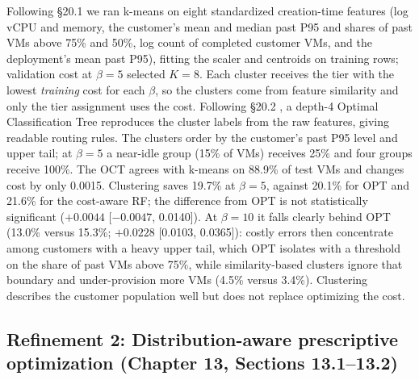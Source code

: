 \documentclass[10pt]{article}
\begin{document}
Following \S20.1 we ran k-means \citep{lloyd1982kmeans} on eight standardized creation-time features (log vCPU and memory, the customer's mean and median past P95 and shares of past VMs above 75\% and 50\%, log count of completed customer VMs, and the deployment's mean past P95), fitting the scaler and centroids on training rows; validation cost at $\beta=5$ selected $K=8$. Each cluster receives the tier with the lowest \emph{training} cost for each $\beta$, so the clusters come from feature similarity and only the tier assignment uses the cost. Following \S20.2 \citep{bertsimas2017oct,bertsimas2021clustering}, a depth-4 Optimal Classification Tree reproduces the cluster labels from the raw features, giving readable routing rules. The clusters order by the customer's past P95 level and upper tail; at $\beta=5$ a near-idle group (15\% of VMs) receives 25\% and four groups receive 100\%. The OCT agrees with k-means on 88.9\% of test VMs and changes cost by only 0.0015. Clustering saves 19.7\% at $\beta=5$, against 20.1\% for OPT and 21.6\% for the cost-aware RF; the difference from OPT is not statistically significant ($+0.0044$ [$-0.0047$, 0.0140]). At $\beta=10$ it falls clearly behind OPT (13.0\% versus 15.3\%; $+0.0228$ [0.0103, 0.0365]): costly errors then concentrate among customers with a heavy upper tail, which OPT isolates with a threshold on the share of past VMs above 75\%, while similarity-based clusters ignore that boundary and under-provision more VMs (4.5\% versus 3.4\%). Clustering describes the customer population well but does not replace optimizing the cost.

\subsection{Refinement 2: Distribution-aware prescriptive optimization (Chapter 13, Sections 13.1--13.2)}
\end{document}
